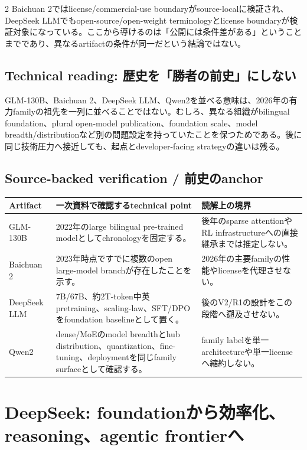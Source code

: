 \documentclass[lualatex,a4paper,10pt]{jlreq}
\begin{document}
\begin{multicols}{2}
Baichuan 2ではlicense/commercial-use boundaryがsource-localに検証され、DeepSeek LLMでもopen-source/open-weight terminologyとlicense boundaryが検証対象になっている。ここから導けるのは「公開には条件差がある」ということまでであり、異なるartifactの条件が同一だという結論ではない。\autocite{baichuan2,deepseekllm}

\subsection{Technical reading: 歴史を「勝者の前史」にしない}
GLM-130B、Baichuan 2、DeepSeek LLM、Qwen2を並べる意味は、2026年の有力familyの祖先を一列に並べることではない。むしろ、異なる組織がbilingual foundation、plural open-model publication、foundation scale、model breadth/distributionなど別の問題設定を持っていたことを保つためである。後に同じ技術圧力へ接近しても、起点とdeveloper-facing strategyの違いは残る。

\end{multicols}

\subsection*{Source-backed verification / 前史のanchor}
\small
\begin{tabularx}{\textwidth}{@{}>{\raggedright\arraybackslash}p{}>{\raggedright\arraybackslash}p{}>{\raggedright\arraybackslash}X@{}}
\toprule
Artifact & 一次資料で確認するtechnical point & 読解上の境界 \\
\midrule
GLM-130B & 2022年のlarge bilingual pre-trained modelとしてchronologyを固定する。 & 後年のsparse attentionやRL infrastructureへの直接継承までは推定しない。 \\
Baichuan 2 & 2023年時点ですでに複数のopen large-model branchが存在したことを示す。 & 2026年の主要familyの性能やlicenseを代理させない。 \\
DeepSeek LLM & 7B/67B、約2T-token中英pretraining、scaling-law、SFT/DPOをfoundation baselineとして置く。 & 後のV2/R1の設計をこの段階へ遡及させない。 \\
Qwen2 & dense/MoEのmodel breadthとhub distribution、quantization、fine-tuning、deploymentを同じfamily surfaceとして確認する。 & family labelを単一architectureや単一licenseへ縮約しない。 \\
\bottomrule
\end{tabularx}
\normalsize
\autocite{glm130b,baichuan2,deepseekllm,qwen2}

\section{DeepSeek: foundationから効率化、reasoning、agentic frontierへ}
\label{sec:deepseek}
\end{document}
